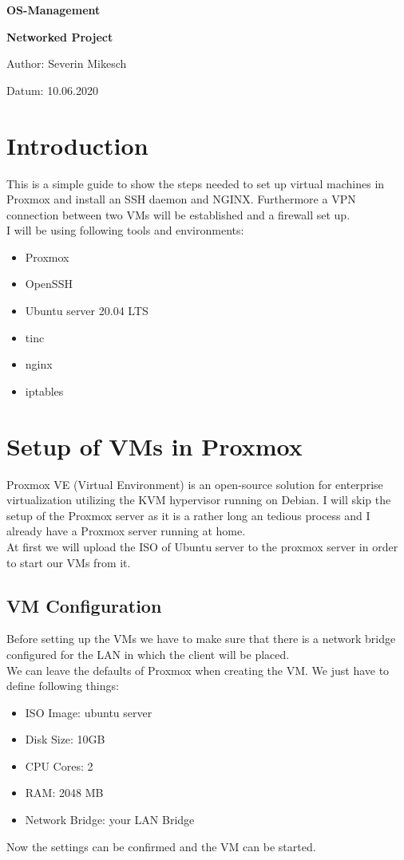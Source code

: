 \documentclass[10pt,a4paper]{article}
\begin{document}
\huge
\begin{center}
{\bf OS-Management}\par
{\bf Networked Project}\par
\vspace{5cm}
\end{center}

\large
Author: Severin Mikesch\par
\vspace{0.8cm}
Datum: 10.06.2020\par
\vspace{0.8cm}

\normalsize


\newpage
\section{Introduction}
This is a simple guide to show the steps needed to set up virtual machines in Proxmox and install an SSH daemon and NGINX. Furthermore a VPN connection between two VMs will be established and a firewall set up.
\\
I will be using following tools and environments:
\begin{itemize}
\item Proxmox
\item OpenSSH
\item Ubuntu server 20.04 LTS
\item tinc
\item nginx
\item iptables
\end{itemize}

\newpage
\section{Setup of VMs in Proxmox}
Proxmox VE (Virtual Environment) is an open-source solution for enterprise virtualization utilizing the KVM hypervisor running on Debian. I will skip the setup of the Proxmox server as it is a rather long an tedious process and I already have a Proxmox server running at home.
\\
At first we will upload the ISO of Ubuntu server to the proxmox server in order to start our VMs from it.

\subsection{VM Configuration}
Before setting up the VMs we have to make sure that there is a network bridge configured for the LAN in which the client will be placed.
\\
We can leave the defaults of Proxmox when creating the VM. We just have to define following things:
\begin{itemize}
\item ISO Image: ubuntu server
\item Disk Size: 10GB
\item CPU Cores: 2
\item RAM: 2048 MB
\item Network Bridge: your LAN Bridge
\end{itemize}
Now the settings can be confirmed and the VM can be started.
\end{document}
